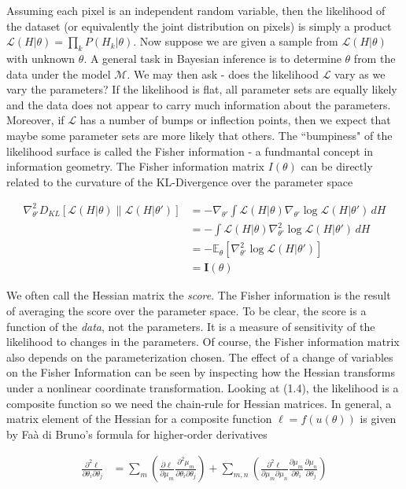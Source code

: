 \documentclass{ucetd}
\begin{document}
Assuming each pixel is an independent random variable, then the likelihood of the dataset (or equivalently the joint distribution on pixels) is simply a product $\mathcal{L}(H|\theta) = \prod_{k}P(H_{k}|\theta)$. Now suppose we are given a sample from $\mathcal{L}(H|\theta)$ with unknown $\theta$. A general task in Bayesian inference is to determine $\theta$ from the data under the model $\mathcal{M}$. We may then ask - does the likelihood $\mathcal{L}$ vary as we vary the parameters? If the likelihood is flat, all parameter sets are equally likely and the data does not appear to carry much information about the parameters. Moreover, if $\mathcal{L}$ has a number of bumps or inflection points, then we expect that maybe some parameter sets are more likely that others. The ``bumpiness" of the likelihood surface is called the Fisher information - a fundmantal concept in information geometry. The Fisher information matrix $I(\theta)$ can be directly related to the curvature of the KL-Divergence over the parameter space

\begin{align*}
\nabla^2_{\theta'} D_{KL}[\mathcal{L}(H|\theta) \parallel \mathcal{L}(H|\theta')] 
&= - \nabla_{\theta'} \int \mathcal{L}(H|\theta) \nabla_{\theta'}  \log \mathcal{L}(H|\theta') \, dH \\ 
&= - \int \mathcal{L}(H|\theta) \nabla^2_{\theta'}  \log \mathcal{L}(H|\theta') \, dH \\
&= - \mathbb{E}_{\theta}[\nabla^2_{\theta'} \log \mathcal{L}(H|\theta')] \\
&= \mathbf{I}(\theta)
\end{align*}


We often call the Hessian matrix the \emph{score}. The Fisher information is the result of averaging the score over the parameter space. To be clear, the score is a function of the \emph{data}, not the parameters. It is a measure of sensitivity of the likelihood to changes in the parameters. Of course, the Fisher information matrix also depends on the parameterization chosen. The effect of a change of variables on the Fisher Information can be seen by inspecting how the Hessian transforms under a nonlinear coordinate transformation. Looking at (1.4), the likelihood is a composite function so we need the chain-rule for Hessian matrices. In general, a matrix element of the Hessian for a composite function $\ell = f(u(\theta))$ is given by Faà di Bruno's formula for higher-order derivatives 

\begin{align*}
\frac{\partial^2 \ell}{\partial \theta_i \partial \theta_j} &= \sum_m \left(\frac{\partial \ell}{\partial \mu_m}\frac{\partial^2 \mu_m}{\partial \theta_i \partial \theta_j}\right) + \sum_{m,n} \left(\frac{\partial^2 \ell}{\partial \mu_m \partial \mu_n}\frac{\partial \mu_m}{\partial \theta_i}\frac{\partial \mu_n}{\partial \theta_j}\right)
\end{align*}
\end{document}
